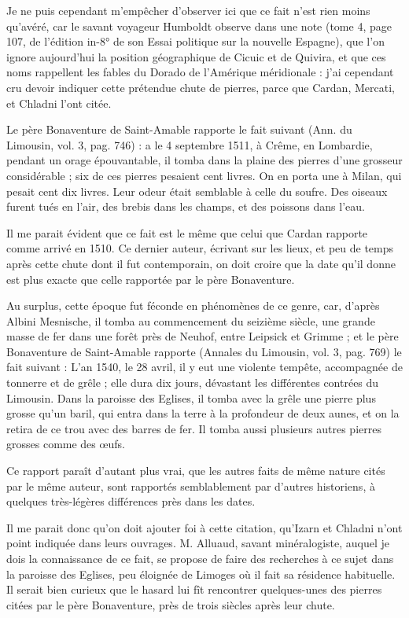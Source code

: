 \documentclass[a4paper, 12pt, oneside, french]{article}
\begin{document}
Je ne puis cependant m'empêcher d'observer ici que ce fait n'est rien moins qu'avéré, car le savant voyageur Humboldt observe dans une note (tome 4, page 107, de l'édition in-8° de son Essai politique sur la nouvelle Espagne), que l'on ignore aujourd'hui la position géographique de Cicuic et de Quivira, et que ces noms rappellent les fables du Dorado de l'Amérique méridionale : j'ai cependant cru devoir indiquer cette prétendue chute de pierres, parce que Cardan, Mercati, et Chladni l'ont citée.

Le père Bonaventure de Saint-Amable rapporte le fait suivant (Ann. du Limousin, vol. 3, pag. 746) : \og a le 4 septembre 1511, à Crême, en Lombardie, pendant un orage épouvantable, il tomba dans la plaine des pierres d'une grosseur considérable ; six de ces pierres pesaient cent livres. On en porta une à Milan, qui pesait cent dix livres. Leur odeur était semblable à celle du soufre. Des oiseaux furent tués en l'air, des brebis dans les champs, et des poissons dans l'eau. \fg

Il me parait évident que ce fait est le même que celui que Cardan rapporte comme arrivé en 1510. Ce dernier auteur, écrivant sur les lieux, et peu de temps après cette chute dont il fut contemporain, on doit croire que la date qu'il donne est plus exacte que celle rapportée par le père Bonaventure.

Au surplus, cette époque fut féconde en phénomènes de ce genre, car, d'après Albini Mesnische, il tomba au commencement du seizième siècle, une grande masse de fer dans une forêt près de Neuhof, entre Leipsick et Grimme ; et le père Bonaventure de Saint-Amable rapporte (Annales du Limousin, vol. 3, pag. 769) le fait suivant : \og L'an 1540, le 28 avril, il y eut une violente tempête, accompagnée de tonnerre et de grêle ; elle dura dix jours, dévastant les différentes contrées du Limousin. Dans la paroisse des Eglises, il tomba avec la grêle une pierre plus grosse qu'un baril, qui entra dans la terre à la profondeur de deux aunes, et on la retira de ce trou avec des barres de fer. Il tomba aussi plusieurs autres pierres grosses comme des œufs. \fg

Ce rapport paraît d'autant plus vrai, que les autres faits de même nature cités par le même auteur, sont rapportés semblablement par d'autres historiens, à quelques très-légères différences près dans les dates.

Il me parait donc qu'on doit ajouter foi à cette citation, qu'Izarn et Chladni n'ont point indiquée dans leurs ouvrages. M. Alluaud, savant minéralogiste, auquel je dois la connaissance de ce fait, se propose de faire des recherches à ce sujet dans la paroisse des Eglises, peu éloignée de Limoges où il fait sa résidence habituelle. Il serait bien curieux que le hasard lui fît rencontrer quelques-unes des pierres citées par le père Bonaventure, près de trois siècles après leur chute.
\end{document}
